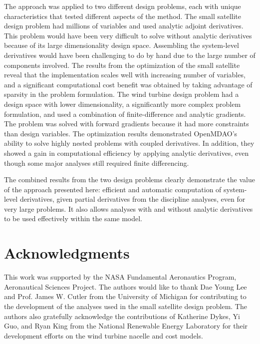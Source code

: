 \documentclass[]{aiaa-tc} %
\begin{document}
      The approach was applied to two different design problems, each with unique characteristics that
      tested different aspects of the method. The small satellite design problem had millions of variables and used analytic adjoint derivatives.
      This problem would have been very difficult to solve without analytic derivatives because of its large dimensionality design space. Assembling the
      system-level derivatives would have been challenging to do by hand due to the large number of components involved.
      The results from the optimization of the small satellite reveal that the implementation scales well with increasing
      number of variables, and a significant computational cost benefit was obtained by taking advantage of
      sparsity in the problem formulation. The wind turbine design problem had a design space with lower dimensionality, a
      significantly more complex problem formulation, and used a combination of finite-difference and analytic
      gradients. The problem was solved with forward gradients because it had more constraints than design variables.
      The optimization results demonstrated OpenMDAO's ability to solve highly nested problems with coupled derivatives.
      In addition, they showed a gain in computational efficiency by applying analytic derivatives, even though some major
      analyses still required finite differencing.

      The combined results from the two design problems clearly demonstrate the value of the approach presented here: efficient and
      automatic computation of system-level derivatives, given partial derivatives from the discipline analyses,
      even for very large problems. It also allows analyses with and without analytic derivatives to be used effectively
      within the same model.


  \section{Acknowledgments}

      This work was supported by the NASA Fundamental Aeronautics Program, Aeronautical Sciences Project.
      The authors would like to thank Dae Young Lee and Prof. James W. Cutler from the University of Michigan
      for contributing to the development of the analyses used in the small satellite design problem.  The authors also gratefully acknowledge the contributions of Katherine Dykes, Yi Guo, and Ryan King from the National Renewable Energy Laboratory for their development efforts on the wind turbine nacelle and cost models.

  
\end{document}
